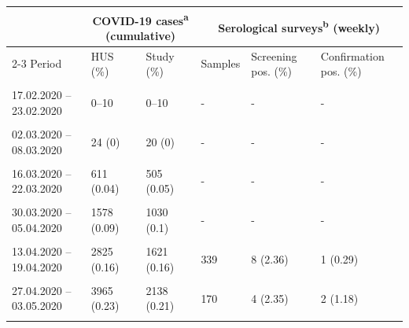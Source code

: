 \centering
\begin{tabular}{l|l|l|l|l|l}
\hline
\multicolumn{1}{c|}{} & \multicolumn{2}{c|}{COVID-19 cases\textsuperscript{a} (cumulative)} & \multicolumn{3}{c}{Serological surveys\textsuperscript{b} (weekly)} \\
\cline{2-3} \cline{4-6}
Period & HUS (\%) & Study (\%) & Samples & Screening pos. (\%) & Confirmation pos. (\%)\\
\hline
\cellcolor{gray!6}{10.02.2020 – 16.02.2020} & \cellcolor{gray!6}{0–10} & \cellcolor{gray!6}{0–10} & \cellcolor{gray!6}{-} & \cellcolor{gray!6}{-} & \cellcolor{gray!6}{-}\\
\hline
17.02.2020 – 23.02.2020 & 0–10 & 0–10 & - & - & -\\
\hline
\cellcolor{gray!6}{24.02.2020 – 01.03.2020} & \cellcolor{gray!6}{0–10} & \cellcolor{gray!6}{0–10} & \cellcolor{gray!6}{-} & \cellcolor{gray!6}{-} & \cellcolor{gray!6}{-}\\
\hline
02.03.2020 – 08.03.2020 & 24 (0) & 20 (0) & - & - & -\\
\hline
\cellcolor{gray!6}{09.03.2020 – 15.03.2020} & \cellcolor{gray!6}{220 (0.01)} & \cellcolor{gray!6}{190 (0.02)} & \cellcolor{gray!6}{-} & \cellcolor{gray!6}{-} & \cellcolor{gray!6}{-}\\
\hline
16.03.2020 – 22.03.2020 & 611 (0.04) & 505 (0.05) & - & - & -\\
\hline
\cellcolor{gray!6}{23.03.2020 – 29.03.2020} & \cellcolor{gray!6}{965 (0.06)} & \cellcolor{gray!6}{737 (0.07)} & \cellcolor{gray!6}{-} & \cellcolor{gray!6}{-} & \cellcolor{gray!6}{-}\\
\hline
30.03.2020 – 05.04.2020 & 1578 (0.09) & 1030 (0.1) & - & - & -\\
\hline
\cellcolor{gray!6}{06.04.2020 – 12.04.2020} & \cellcolor{gray!6}{2212 (0.13)} & \cellcolor{gray!6}{1332 (0.13)} & \cellcolor{gray!6}{23} & \cellcolor{gray!6}{1 (4.35)} & \cellcolor{gray!6}{0 (0)}\\
\hline
13.04.2020 – 19.04.2020 & 2825 (0.16) & 1621 (0.16) & 339 & 8 (2.36) & 1 (0.29)\\
\hline
\cellcolor{gray!6}{20.04.2020 – 26.04.2020} & \cellcolor{gray!6}{3436 (0.2)} & \cellcolor{gray!6}{1895 (0.19)} & \cellcolor{gray!6}{465} & \cellcolor{gray!6}{13 (2.8)} & \cellcolor{gray!6}{2 (0.43)}\\
\hline
27.04.2020 – 03.05.2020 & 3965 (0.23) & 2138 (0.21) & 170 & 4 (2.35) & 2 (1.18)\\
\hline
\cellcolor{gray!6}{04.05.2020 – 10.05.2020} & \cellcolor{gray!6}{4466 (0.26)} & \cellcolor{gray!6}{2415 (0.24)} & \cellcolor{gray!6}{139} & \cellcolor{gray!6}{2 (1.44)} & \cellcolor{gray!6}{0 (0)}\\

\end{tabular}
